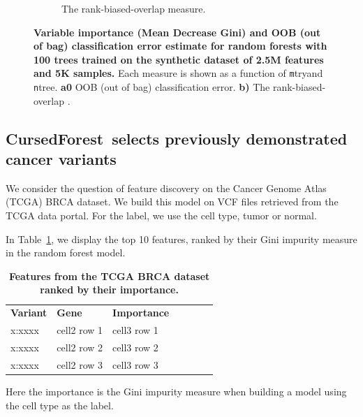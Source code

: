 \documentclass[10pt,letterpaper]{article}
\newlength\savedwidth
\newcommand\thickhline{\noalign{\global\savedwidth\arrayrulewidth\global\arrayrulewidth 2pt}%
\hline
\noalign{\global\arrayrulewidth\savedwidth}}
\newcommand{\cursedforest}{{\sc CursedForest}}
\newcommand{\mtry}{{\texttt mtry}}
\newcommand{\ntree}{{\texttt ntree}}
\begin{document}
\begin{figure}[tbhp]
\begin{adjustwidth}{-1.00in}{0in}
\begin{subfigure}[b]{0.5\linewidth}
    \caption{The  rank-biased-overlap measure.} 
    \label{fig7:b} 
    \vspace{4ex}
  \end{subfigure} 
  \caption{{\bf Variable importance (Mean Decrease Gini) and OOB (out of bag) classification error estimate for random
      forests with 100 trees trained on the synthetic dataset of 2.5M features and 5K samples.}  Each measure is shown
    as a function of \mtry and \ntree. {\bf a0} OOB (out of bag) classification error.  {\bf b)} The rank-biased-overlap \cite[]{Webber.et.al.2010}. }
  \label{figure:synth}
\end{adjustwidth}
\end{figure}




\subsection{\cursedforest\ selects previously demonstrated cancer variants}
We consider the question of feature discovery on the Cancer Genome Atlas (TCGA) BRCA dataset.  We build this model on
VCF files retrieved from the TCGA data portal.  For the label, we use the cell type, tumor or normal.

In Table~\ref{featuretable}, we display the top 10 features, ranked by their Gini impurity measure in the random forest model.

\begin{table}[!ht]
\centering
\caption{
{\bf Features from the TCGA BRCA dataset ranked by their importance.}}
\begin{tabular}{|l|l|l|l|l|l|l|}
\hline
{\bf Variant} & {\bf Gene} & {\bf Importance}\\ \thickhline
x:xxxx & cell2 row 1 & cell3 row 1\\ \hline
x:xxxx & cell2 row 2 & cell3 row 2\\ \hline
x:xxxx & cell2 row 3 & cell3 row 3\\ \hline
\end{tabular}
\begin{flushleft} Here the importance is the Gini impurity measure when building a model using the cell type as the label.
\end{flushleft}
\label{featuretable}
\end{table}
\end{document}
